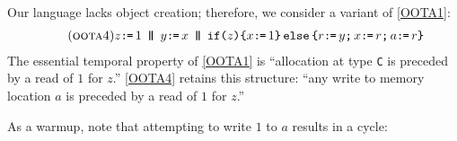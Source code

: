 \begin{example}
  \label{ex:lochb}
  Our language lacks object creation; therefore, we consider a variant of
  \ref{OOTA1}:
\begin{align*}
  \tag{\textsc{oota4}}\label{OOTA4}
  z\GETS1
  \PAR
    y\GETS x
  \PAR
    \IF{z}\THEN x\GETS1 \ELSE r\GETS y \SEMI x\GETS r \SEMI a\GETS r \FI
  \end{align*}
  The essential temporal property of \ref{OOTA1} is ``allocation at type
  \texttt{C} is preceded by a read of $1$ for $z$.''  \ref{OOTA4} retains
  this structure: ``any write to memory location $a$ is preceded by a read of $1$
  for $z$.''

  As a warmup, note that attempting to write $1$ to $a$ results
  in a cycle:
\begin{tikzdisplay}[node distance=1.5em]
\end{tikzdisplay}


\end{example}
